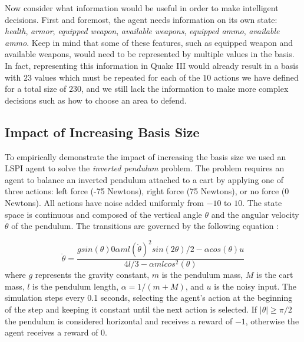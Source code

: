 Now consider what information would be useful in order to make intelligent decisions. First and foremost, the agent needs information on its own state: \emph{health}, \emph{armor}, \emph{equipped weapon}, \emph{available weapons}, \emph{equipped ammo}, \emph{available ammo}. Keep in mind that some of these features, such as equipped weapon and available weapons, would need to be represented by multiple values in the basis. In fact, representing this information in Quake III would already result in a basis with $23$ values which must be repeated for each of the $10$ actions we have defined for a total size of $230$, and we still lack the information to make more complex decisions such as how to choose an area to defend.

\subsection{Impact of Increasing Basis Size}

To empirically demonstrate the impact of increasing the basis size we used an LSPI agent to solve the \emph{inverted pendulum} problem. The problem requires an agent to balance an inverted pendulum attached to a cart by applying one of three actions: left force (-75 Newtons), right force (75 Newtons), or no force (0 Newtons). All actions have noise added uniformly from $-10$ to $10$. The state space is continuous and composed of the vertical angle $\theta$ and the angular velocity $\dot{\theta}$ of the pendulum. The transitions are governed by the following equation \cite{lspi}:

\begin{equation}
    \ddot{\theta} = \frac{g sin(\theta) 0 \alpha ml(\dot{\theta})^2 sin(2\theta)/2 - \alpha cos(\theta)u}{4l/3 - \alpha ml cos^2(\theta)}
\label{eq:pendulum}
\end{equation}
where $g$ represents the gravity constant, $m$ is the pendulum mass, $M$ is the cart mass, $l$ is the pendulum length, $\alpha = 1/(m + M)$, and $u$ is the noisy input. The simulation steps every 0.1 seconds, selecting the agent's action at the beginning of the step and keeping it constant until the next action is selected. If $|\theta| \geq \pi/2$ the pendulum is considered horizontal and receives a reward of $-1$, otherwise the agent receives a reward of 0.

